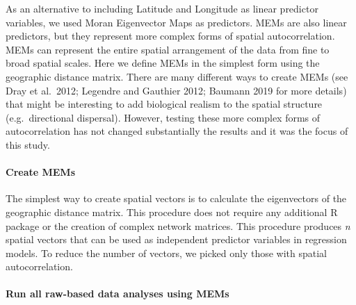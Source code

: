 \documentclass[]{article}
\newenvironment{Shaded}{\begin{snugshade}}{\end{snugshade}}
\newcommand{\CommentTok}[1]{\textcolor[rgb]{0.56,0.35,0.01}{\textit{#1}}}
\newcommand{\ControlFlowTok}[1]{\textcolor[rgb]{0.13,0.29,0.53}{\textbf{#1}}}
\newcommand{\DecValTok}[1]{\textcolor[rgb]{0.00,0.00,0.81}{#1}}
\newcommand{\KeywordTok}[1]{\textcolor[rgb]{0.13,0.29,0.53}{\textbf{#1}}}
\newcommand{\NormalTok}[1]{#1}
\newcommand{\OperatorTok}[1]{\textcolor[rgb]{0.81,0.36,0.00}{\textbf{#1}}}
\let\oldparagraph\paragraph
\renewcommand{\paragraph}[1]{\oldparagraph{#1}\mbox{}}
\begin{document}
As an alternative to including Latitude and Longitude as linear
predictor variables, we used Moran Eigenvector Maps as predictors. MEMs
are also linear predictors, but they represent more complex forms of
spatial autocorrelation. MEMs can represent the entire spatial
arrangement of the data from fine to broad spatial scales. Here we
define MEMs in the simplest form using the geographic distance matrix.
There are many different ways to create MEMs (see Dray et al.~2012;
Legendre and Gauthier 2012; Baumann 2019 for more details) that might be
interesting to add biological realism to the spatial structure
(e.g.~directional dispersal). However, testing these more complex forms
of autocorrelation has not changed substantially the results and it was
the focus of this study.

\hypertarget{create-mems}{%
\paragraph{Create MEMs}\label{create-mems}}

The simplest way to create spatial vectors is to calculate the
eigenvectors of the geographic distance matrix. This procedure does not
require any additional R package or the creation of complex network
matrices. This procedure produces \emph{n} spatial vectors that can be
used as independent predictor variables in regression models. To reduce
the number of vectors, we picked only those with spatial
autocorrelation.

\begin{Shaded}
\end{Shaded}

\hypertarget{run-all-raw-based-data-analyses-using-mems}{%
\paragraph{Run all raw-based data analyses using
MEMs}\label{run-all-raw-based-data-analyses-using-mems}}
\end{document}
